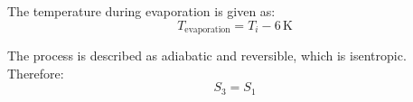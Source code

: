The temperature during evaporation is given as:  
\[
T_{\text{evaporation}} = T_i - 6 \, \text{K}
\]  

The process is described as adiabatic and reversible, which is isentropic. Therefore:  
\[
S_3 = S_1
\]